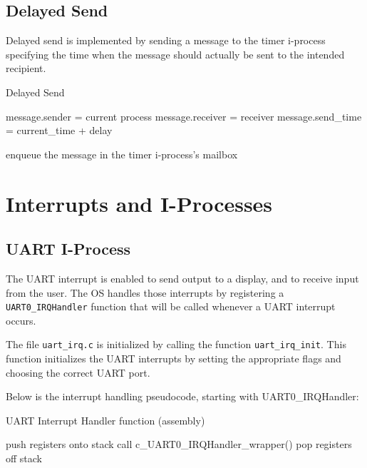 \documentclass[12pt]{report}
\begin{document}
\subsection{Delayed Send}

Delayed send is implemented by sending a message to the timer i-process specifying the time when the message should actually be sent to the intended recipient.

\begin{algorithm}[H]
	\caption{Delayed Send}
	\begin{algorithmic}[1]
			\State message.sender = current process
			\State message.receiver = receiver
			\State message.send_time = current_time + delay

			\State enqueue the message in the timer i-process's mailbox 
		\EndFunction
	\end{algorithmic}
\end{algorithm}


\section{Interrupts and I-Processes}

\subsection{UART I-Process}

The UART interrupt is enabled to send output to a display, and to receive input from the user. The OS handles those interrupts by registering a \texttt{UART0_IRQHandler} function that will be called whenever a UART interrupt occurs.

The file \texttt{uart_irq.c} is initialized by calling the function \texttt{uart_irq_init}. This function initializes the UART interrupts by setting the appropriate flags and choosing the correct UART port.

Below is the interrupt handling pseudocode, starting with UART0_IRQHandler:
\begin{algorithm}[H]
	\caption{UART Interrupt Handler function (assembly)}
	\begin{algorithmic}[1]
	    \State push registers onto stack
	    \State call c_UART0_IRQHandler_wrapper()
	    \State pop registers off stack
	  \EndFunction
	\end{algorithmic}
\end{algorithm}
\end{document}
